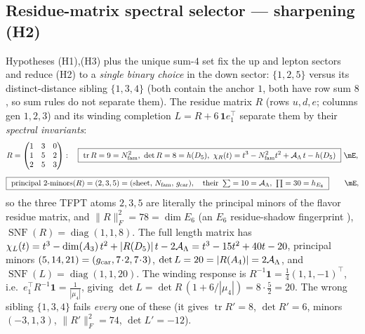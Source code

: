 \subsection{Residue-matrix spectral selector --- sharpening (H2)}
Hypotheses (H1),(H3) plus the unique sum-$4$ set fix the up and lepton sectors and reduce (H2) to a
\emph{single binary choice} in the down sector: $\{1,2,5\}$ versus its distinct-distance sibling
$\{1,3,4\}$ (both contain the anchor $1$, both have row sum $8$, so sum rules do not separate them). The
residue matrix $R$ (rows $u,d,e$; columns gen $1,2,3$) and its winding completion $L=R+6\,\mathbf 1 e_1^{\!\top}$
separate them by their \emph{spectral invariants}:
\begin{equation}
  R=\begin{pmatrix}1&3&0\\1&5&2\\2&5&3\end{pmatrix}:\quad
  \boxed{\ \operatorname{tr}R=9=\Nfam^2,\ \det R=8=h(D_5),\ \chi_R(t)=t^3-\Nfam^2t^2+\AL\,t-h(D_5)\ }\ \mE ,
\end{equation}
\begin{equation}
  \boxed{\ \text{principal $2$-minors}(R)=(2,3,5)=(\text{sheet},\,\Nfam,\,\gcar),\quad
  \text{their }\textstyle\sum=10=\AL,\ \prod=30=h_{E_8}\ }\qquad\mE ,
\end{equation}
so the three TFPT atoms $2,3,5$ are literally the principal minors of the flavor residue matrix, and
$\|R\|_F^2=78=\dim E_6$ (an $E_6$ residue-shadow fingerprint \mO), $\operatorname{SNF}(R)=\operatorname{diag}(1,1,8)$.
The full length matrix has $\chi_L(t)=t^3-\dim(A_3)\,t^2+|R(D_5)|\,t-2\mathcal A_\Lambda=t^3-15t^2+40t-20$, principal
minors $(5,14,21)=(g_{\mathrm{car}},7\!\cdot\!2,7\!\cdot\!3)$, $\det L=20=|R(A_4)|=2\mathcal A_\Lambda$, and
$\operatorname{SNF}(L)=\operatorname{diag}(1,1,20)$. The winding response is
$R^{-1}\mathbf 1=\tfrac14(1,1,-1)^{\!\top}$, i.e.\ $e_1^{\!\top}R^{-1}\mathbf 1=\tfrac1{|\mu_4|}$, giving
$\det L=\det R\,(1+6/|\mu_4|)=8\cdot\tfrac52=20$. The wrong sibling $\{1,3,4\}$ fails \emph{every} one of
these (it gives $\operatorname{tr}R'=8$, $\det R'=6$, minors $(-3,1,3)$, $\|R'\|_F^2=74$, $\det L'=-12$).

